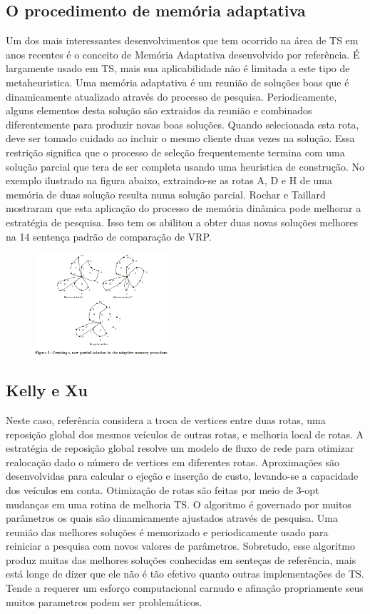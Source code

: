 \documentclass[a4paper, 12pt]{article}
\begin{document}
\subsection{O procedimento de memória adaptativa}

 Um dos mais interessantes desenvolvimentos que tem ocorrido na área de TS em anos recentes é o
conceito de Memória Adaptativa desenvolvido por {\color{red} referência}. É largamente usado em TS,
mais sua aplicabilidade não é limitada a este tipo de metaheuristica. Uma memória adaptativa é um
reunião de soluções boas que é dinamicamente atualizado através do processo de pesquisa.
Periodicamente, alguns elementos desta solução são extraidos da reunião e combinados diferentemente
para produzir novas boas soluções. Quando selecionada esta rota, deve ser tomado cuidado ao incluir
o mesmo cliente duas vezes na solução. Essa restrição significa que o processo de seleção
frequentemente termina com uma solução parcial que tera de ser completa usando uma heuristica de
construção. No exemplo ilustrado na figura abaixo, extraindo-se as rotas A, D e H de uma memória de
duas solução resulta numa solução parcial. Rochar e Taillard mostraram que esta aplicação do
processo de memória dinâmica pode melhorar a estratégia de pesquisa. Isso tem os abilitou a obter
duas novas soluções melhores na 14 sentença padrão de comparação de VRP.

\begin{figure}[!ht]
\centering
\includegraphics[width=5cm]{.images/RochatTaillard95.png}
\end{figure}


\subsection{Kelly e Xu}

 Neste caso, {\color{red} referência} considera a troca de vertices entre duas rotas, uma reposição
global dos mesmos veículos de outras rotas, e melhoria local de rotas. A estratégia de reposição
global resolve um modelo de fluxo de rede para otimizar realocação dado o número de vertices em
diferentes rotas. Aproximações são desenvolvidas para calcular o ejeção e inserção de custo,
levando-se a capacidade dos veículos em conta. Otimização de rotas são feitas por meio de 3-opt
mudanças em uma rotina de melhoria TS. O algoritmo é governado por muitos parâmetros os quais são
dinamicamente ajustados através de pesquisa. Uma reunião das melhores soluções é memorizado e
periodicamente usado para reiniciar a pesquisa com novos valores de parâmetros. Sobretudo, esse
algoritmo produz muitas das melhores soluções conhecidas em senteças de referência, mais está longe
de dizer que ele não é tão efetivo quanto outras implementações de TS. Tende a requerer um esforço
computacional carnudo e afinação propriamente seus muitos parametros podem ser problemáticos.
\end{document}
